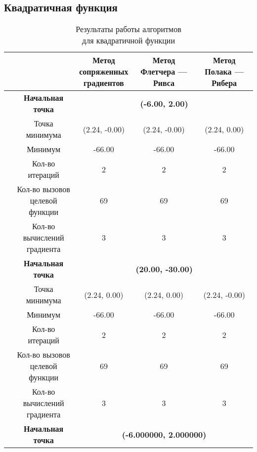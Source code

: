 \subsection{Квадратичная функция}

\begin{table}[H]
        \centering
        \vspace*{-1.5em}
        \caption{Результаты работы алгоритмов\\для квадратичной функции}
        \footnotesize
        \begin{tabular}{|c|c|c|c|c|}
        \hline
        & &\makecell{Метод\\сопряженных\\градиентов} &\makecell{Метод\\Флетчера --- Ривса} &\makecell{Метод\\Полака --- Рибера} \\
        \hline
	\multirow{10}{*}{\rotatebox[origin=c]{90}{$\varepsilon = 0.01$}}&\textbf{Начальная точка} &\multicolumn{3}{c|}{\textbf{(-6.00, 2.00)}}\\
	\cline{2-5}
	&Точка минимума &(2.24, -0.00) &(2.24, -0.00) &(2.24, 0.00) \\ 
	\cline{2-5}
	&Минимум &-66.00 &-66.00 &-66.00 \\ 
	\cline{2-5}
	&Кол-во итераций &2 &2 &2 \\ 
	\cline{2-5}
	&\makecell{Кол-во вызовов\\целевой функции} &69 &69 &69 \\ 
	\cline{2-5}
	&\makecell{Кол-во вычислений\\градиента} &3 &3 &3 \\ 
	\cline{2-5}
\cline{2-5}&\textbf{Начальная точка} &\multicolumn{3}{c|}{\textbf{(20.00, -30.00)}}\\
	\cline{2-5}
	&Точка минимума &(2.24, 0.00) &(2.24, 0.00) &(2.24, -0.00) \\ 
	\cline{2-5}
	&Минимум &-66.00 &-66.00 &-66.00 \\ 
	\cline{2-5}
	&Кол-во итераций &2 &2 &2 \\ 
	\cline{2-5}
	&\makecell{Кол-во вызовов\\целевой функции} &69 &69 &69 \\ 
	\cline{2-5}
	&\makecell{Кол-во вычислений\\градиента} &3 &3 &3 \\ 
	\cline{2-5}
	\hline
	\multirow{10}{*}{\rotatebox[origin=c]{90}{$\varepsilon = 1e-06$}}&\textbf{Начальная точка} &\multicolumn{3}{c|}{\textbf{(-6.000000, 2.000000)}}\\

\end{tabular}
\end{table}
